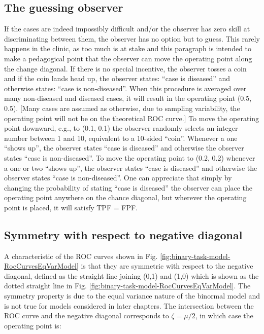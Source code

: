 \documentclass[
]{book}
\begin{document}
\hypertarget{binary-task-model-guessing-observer}{%
\subsection{The guessing observer}\label{binary-task-model-guessing-observer}}

If the cases are indeed impossibly difficult and/or the observer has zero skill at discriminating between them, the observer has no option but to guess. This rarely happens in the clinic, as too much is at stake and this paragraph is intended to make a pedagogical point that the observer can move the operating point along the change diagonal. If there is no special incentive, the observer tosses a coin and if the coin lands head up, the observer states: ``case is diseased'' and otherwise states: ``case is non-diseased''. When this procedure is averaged over many non-diseased and diseased cases, it will result in the operating point (0.5, 0.5). {[}Many cases are assumed as otherwise, due to sampling variability, the operating point will not be on the theoretical ROC curve.{]} To move the operating point downward, e.g., to (0.1, 0.1) the observer randomly selects an integer number between 1 and 10, equivalent to a 10-sided ``coin''. Whenever a one ``shows up'', the observer states ``case is diseased'' and otherwise the observer states ``case is non-diseased''. To move the operating point to (0.2, 0.2) whenever a one or two ``shows up'', the observer states ``case is diseased'' and otherwise the observer states ``case is non-diseased''. One can appreciate that simply by changing the probability of stating ``case is diseased'' the observer can place the operating point anywhere on the chance diagonal, but wherever the operating point is placed, it will satisfy TPF = FPF.

\hypertarget{binary-task-model-symmetry-wrt-negative-diagonal}{%
\subsection{Symmetry with respect to negative diagonal}\label{binary-task-model-symmetry-wrt-negative-diagonal}}

A characteristic of the ROC curves shown in Fig. \ref{fig:binary-task-model-RocCurvesEqVarModel} is that they are symmetric with respect to the negative diagonal, defined as the straight line joining (0,1) and (1,0) which is shown as the dotted straight line in Fig. \ref{fig:binary-task-model-RocCurvesEqVarModel}. The symmetry property is due to the equal variance nature of the binormal model and is not true for models considered in later chapters. The intersection between the ROC curve and the negative diagonal corresponds to \(\zeta = \mu/2\), in which case the operating point is:
\end{document}
